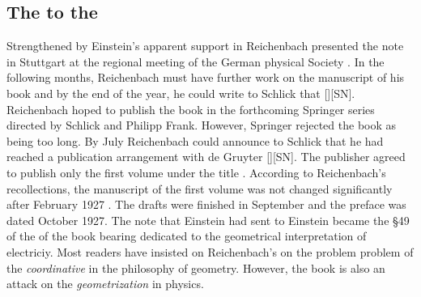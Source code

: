 \documentclass[draft]{article}
\newcommand{\PRZL}{\citetitle{Reichenbach1928}\xspace}
\newcommand{\Reich}{Reichenbach\xspace}
\newcommand{\FP}{\german{Fernparallelismus}\xspace}
\begin{document}
\subsection{The \Ap to the \PRZL}

Strengthened by Einstein's apparent support in  Reichenbach presented the note in Stuttgart at the regional meeting of the German physical Society \citep{Reichenbach1926d}. In the following months, Reichenbach must have further work on the manuscript of his book and by the end of the year, he could write to Schlick that  [][SN]\label{RZL1926}. Reichenbach hoped to publish the book in the forthcoming Springer series  directed by Schlick and Philipp Frank. However, Springer rejected the book as being too long. By July Reichenbach could announce to Schlick that he had reached a publication arrangement with de Gruyter [][SN]. The publisher agreed to publish only the first volume under the title . According to \Reich's recollections, the manuscript of the first volume was not changed significantly after February 1927 \citep[044-06-25]{HR}. The drafts were finished in September and the preface was dated October 1927. The note that Einstein had sent to Einstein became the \S49 of the \Ap of the book bearing dedicated to the geometrical interpretation of electriciy. Most readers have insisted on Reichenbach's on the problem problem of the \emph{coordinative} in the philosophy of geometry. However, the book is also an attack on the \emph{geometrization} in physics.


 
\end{document}
